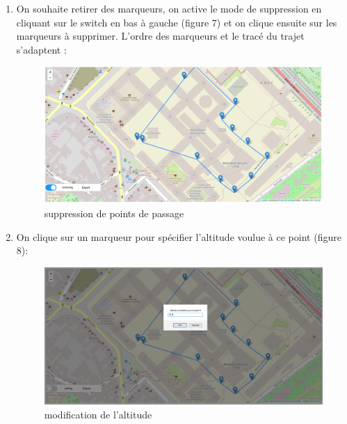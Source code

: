 \documentclass{article}
\begin{document}
\begin{enumerate}
  	\item On souhaite retirer des marqueurs, on active le mode de suppression en cliquant sur le switch en bas à gauche (figure 7) et on clique ensuite sur les marqueurs à supprimer. L'ordre des marqueurs et le tracé du trajet s'adaptent :\\
	\begin{figure}[!h]
 	\begin{center}
 	\includegraphics[scale=0.42]{capt5.PNG}
 	\caption{suppression de points de passage}
 	\end{center}
 	\end{figure}
	\newpage
	\item On clique sur un marqueur pour spécifier l'altitude voulue à ce point (figure 8):
	\begin{figure}[!h]
 	\begin{center}
 	\includegraphics[scale=0.42]{capt6.PNG}
 	\caption{modification de l'altitude}
 	\end{center}
 	\end{figure}
 	

\end{enumerate}
\end{document}

